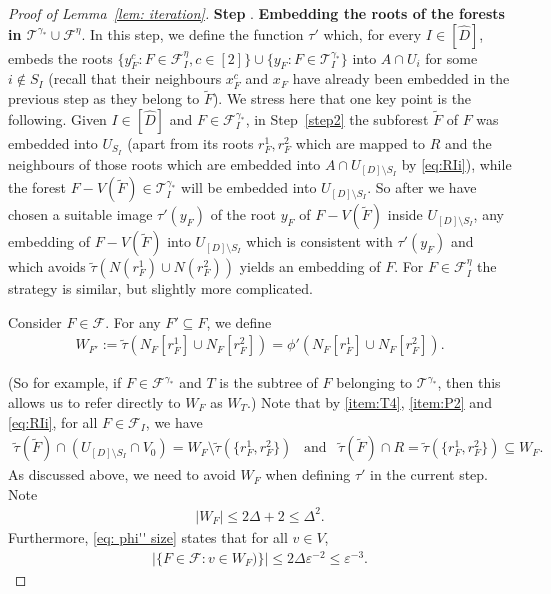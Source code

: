 \documentclass[a4paper, 11pt, reqno]{amsart}
\numberwithin{equation}{section}
\newcommand{\1}{{\rm 1\hspace*{-0.4ex}%
\rule{0.1ex}{1.52ex}\hspace*{0.2ex}}}
\newcommand{\cF}{\mathcal{F}}
\newcommand{\I}{I}
\newcommand{\sF}{\mathscr{F}}
\newcommand{\sT}{\mathscr{T}}
\renewcommand{\epsilon}{\varepsilon}
\newcommand{\sm}{\setminus}
\newcommand{\sub}{\subseteq}
\newcommand{\COMMENT}[1]{}
\newcounter{step}
\newcommand{\step}[1]{\bigskip\refstepcounter{step}\textbf{Step \thestep}. \textbf{#1}.}
\begin{document}
\begin{proof}[Proof of Lemma~\ref{lem: iteration}]
\step{Embedding the roots of the forests in $\sT^{\gamma_*}\cup \sF^\eta$}\label{step3}
In this step, 
we define the function $\tau'$ which,
for every ${\I}\in [\hat{D}]$, 
embeds the roots $\{y^{c}_F : F\in \sF^{\eta}_{\I}, c\in [2]\} \cup \{y_F: F\in \sT^{\gamma_*}_{\I}\}$ into $A\cap U_i$ for some $i\notin S_\I$ 
(recall that their neighbours $x_F^c$ and $x_F$ have already been embedded in the previous step as they belong to $\tilde{F}$). 
We stress here that one key point is the following.
Given ${\I} \in [\hat{D}]$ and $F\in \cF_{\I}^{\gamma_*}$,
in Step~\ref{step2} the subforest $\tilde{F}$ of $F$ was embedded into $U_{S_{\I}}$ 
(apart from its roots $r_F^1,r_F^2$ which are mapped to $R$ and the neighbours of those roots which are embedded into $A\cap U_{[D]\setminus S_I}$ by \eqref{eq:RIi}),
while the forest $F-V(\tilde{F})\in \sT^{\gamma_*}_\I$ will be embedded into $U_{[D]\sm S_{\I}}$.
So after we have chosen a suitable image $\tau'(y_F)$ of the root $y_F$ of $F-V(\tilde{F})$ inside $U_{[D]\sm S_{\I}}$,
any embedding of $F-V(\tilde{F})$ into $U_{[D]\sm S_{\I}}$ which is consistent with $\tau'(y_F)$ and which avoids $\tilde{\tau}(N(r_F^1)\cup N(r_F^2))$
yields an embedding of $F$.
For $F\in \cF_{\I}^{\eta}$ the strategy is similar, but slightly more complicated.




Consider $F\in \cF$.
For any $F'\sub F$, we define
\begin{align}\label{eq:WF}
	W_{F'}:= \tilde{\tau}(N_{F}[r^1_F]\cup N_{F}[r^2_F])=\phi'(N_{F}[r^1_F]\cup N_{F}[r^2_F]).
\end{align}
\COMMENT{intentionally no primes on the right hand side}
(So for example, if $F\in \cF^{\gamma_*}$ and $T$ is the subtree of $F$ belonging to $\sT^{\gamma_*}$, 
then this allows us to refer directly to $W_F$ as $W_T$.)
Note that by \ref{item:T4}, \ref{item:P2} and \eqref{eq:RIi}, for all $F\in \cF_\I$, 
we have 
\begin{align}\label{eq:WF1}
	\tilde{\tau}(\tilde{F})\cap (U_{[D]\sm S_{\I}}\cap V_0)= W_F\sm \tilde{\tau}(\{r^1_F,r^2_F\})
	\enspace\text{ and }\enspace
	\tilde{\tau}(\tilde{F})\cap R = \tilde{\tau}(\{r_F^1,r_F^2\})\sub W_F.
\end{align}
As discussed above, we need to avoid $W_F$ when defining $\tau'$ in the current step.
Note 
\begin{align}\label{eq: WF size}
|W_F|\leq 2\Delta+2 \leq \Delta^2.
\end{align}
Furthermore, \eqref{eq: phi'' size} states that for all $v\in V$, 
\begin{align}\label{eq: not too many W_F}
|\{F\in \cF : v\in W_F )\}| \leq 2\Delta\epsilon^{-2} \leq \epsilon^{-3}.
\end{align}


\end{proof}
\end{document}
